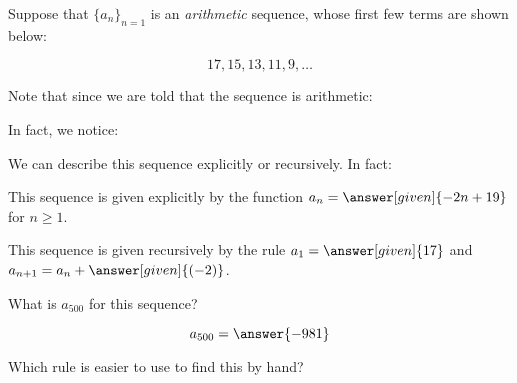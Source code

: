 \documentclass{ximera}
\author{Jim Talamo and Bart Snapp}
\begin{document}
\begin{exercise}

Suppose that $\{a_n\}_{n=1}$ is an \emph{arithmetic} sequence, whose first few terms are shown below:

\[
17, 15, 13, 11, 9, \ldots
\]

Note that since we are told that the sequence is arithmetic:

\begin{multipleChoice}
\end{multipleChoice}

\begin{exercise}
In fact, we notice:
  \begin{image}
  \end{image}
  
  We can describe this sequence explicitly or recursively. In fact:
  
  This sequence is given explicitly by the function $a_n=\answer[given]{-2n + 19}$ for $n \geq 1$.
  
  This sequence is given recursively by the rule $a_1 = \answer[given]{17}$ and $a_{n+1} = a_n +
  \answer[given]{(-2)}$. 

\begin{exercise}
What is $a_{500}$ for this sequence?

\[
a_{500}=\answer{-981}
\]

Which rule is easier to use to find this by hand?

\end{exercise}
  
\end{exercise}
\end{exercise}
\end{document}

